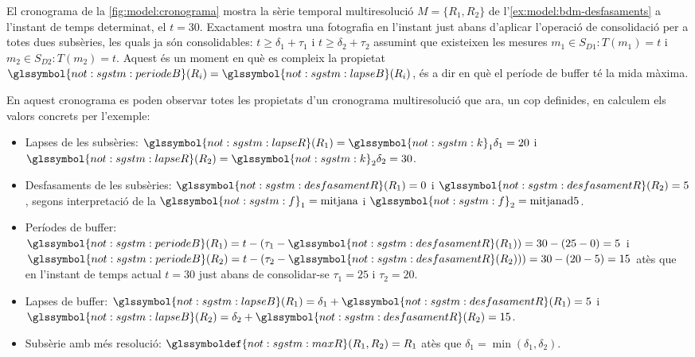 \begin{example}
  \label{ex:sgstm:abanscons}
  El cronograma de la \autoref{fig:model:cronograma} mostra la sèrie
  temporal multiresolució $M=\{R_1,R_2\}$ de
  l'\autoref{ex:model:bdm-desfasaments} a l'instant de temps
  determinat, el $t=30$. Exactament mostra una fotografia en
  l'instant just abans d'aplicar l'operació de consolidació per a
  totes dues subsèries, les quals ja són consolidables:
  $t\geq\delta_1+\tau_1$ i $t\geq\delta_2+\tau_2$ assumint que
  existeixen les mesures $m_1\in S_{D1}: T(m_1)=t$ i $m_2\in S_{D2}:
  T(m_2)=t$.  Aquest és un moment en què es compleix la propietat
  $\glssymbol{not:sgstm:periodeB}(R_i)=\glssymbol{not:sgstm:lapseB}(R_i)$,
  és a dir en què el període de buffer té la mida màxima.

  En aquest cronograma es poden observar totes les propietats d'un
  cronograma multiresolució que ara, un cop definides, en calculem els
  valors concrets per l'exemple:
  \begin{itemize}
  \item Lapses de les subsèries:
    $\glssymbol{not:sgstm:lapseR}(R_1)=\glssymbol{not:sgstm:k}_1\delta_1=20$ i
    $\glssymbol{not:sgstm:lapseR}(R_2)=\glssymbol{not:sgstm:k}_2\delta_2=30$.
  \item Desfasaments de les subsèries:
    $\glssymbol{not:sgstm:desfasamentR}(R_1)=0$ i
    $\glssymbol{not:sgstm:desfasamentR}(R_2)=5$, segons interpretació
    de la $\glssymbol{not:sgstm:f}_1=\text{mitjana}$ i $\glssymbol{not:sgstm:f}_2=\text{mitjanad5}$.
  \item Períodes de buffer: $\glssymbol{not:sgstm:periodeB}(R_1)
    =t-(\tau_1-\glssymbol{not:sgstm:desfasamentR}(R_1))
    =30-(25-0)=5$ i $\glssymbol{not:sgstm:periodeB}(R_2)
    =t-(\tau_2-\glssymbol{not:sgstm:desfasamentR}(R_2)))
    =30-(20-5)=15$ atès que en l'instant de temps actual $t=30$ just
    abans de consolidar-se $\tau_1=25$ i $\tau_2=20$.
  \item Lapses de buffer: $\glssymbol{not:sgstm:lapseB}(R_1)=
    \delta_1+\glssymbol{not:sgstm:desfasamentR}(R_1)=5$ i
    $\glssymbol{not:sgstm:lapseB}(R_2)=
    \delta_2+\glssymbol{not:sgstm:desfasamentR}(R_2)=15$.
  \item Subsèrie amb més resolució:
    $\glssymboldef{not:sgstm:maxR}(R_1,R_2)=R_1$ atès que
    $\delta_1=\min(\delta_1,\delta_2)$.
  \end{itemize}




\end{example}



